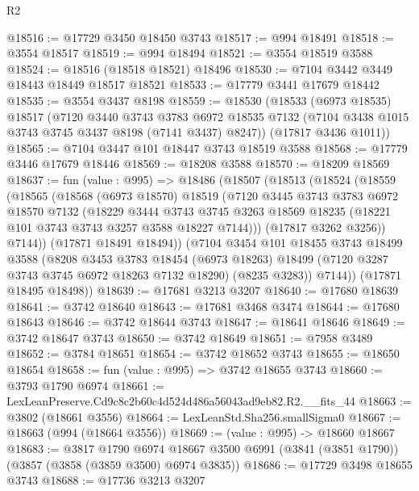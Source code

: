 \begin{lexlean}{R2}
\begin{coremodule}
@18516 := @17729 @3450 @18450 @3743
@18517 := @994 @18491
@18518 := @3554 @18517
@18519 := @994 @18494
@18521 := @3554 @18519 @3588
@18524 := @18516 (@18518 @18521) @18496
@18530 := @7104 @3442 @3449 @18443 @18449 @18517 @18521
@18533 := @17779 @3441 @17679 @18442
@18535 := @3554 @3437 @8198
@18559 := @18530
    (@18533
      (@6973 @18535)
      @18517
      (@7120
        @3440
        @3743
        @3783
        @6972
        @18535
        @7132
        (@7104 @3438 @1015 @3743 @3745 @3437 @8198 (@7141 @3437) @8247))
      (@17817 @3436 @1011))
@18565 := @7104 @3447 @101 @18447 @3743 @18519 @3588
@18568 := @17779 @3446 @17679 @18446
@18569 := @18208 @3588
@18570 := @18209 @18569
@18637 := fun (value : @995) =>
  @18486
    (@18507
      (@18513
        (@18524
          (@18559
            (@18565
              (@18568
                (@6973 @18570)
                @18519
                (@7120
                  @3445
                  @3743
                  @3783
                  @6972
                  @18570
                  @7132
                  (@18229
                    @3444
                    @3743
                    @3745
                    @3263
                    @18569
                    @18235
                    (@18221 @101 @3743 @3743 @3257 @3588 @18227 @7144)))
                (@17817 @3262 @3256))
              @7144))
          (@17871 @18491 @18494))
        (@7104
          @3454
          @101
          @18455
          @3743
          @18499
          @3588
          (@8208
            @3453
            @3783
            @18454
            (@6973 @18263)
            @18499
            (@7120 @3287 @3743 @3745 @6972 @18263 @7132 @18290)
            (@8235 @3283))
          @7144))
      (@17871 @18495 @18498))
@18639 := @17681 @3213 @3207
@18640 := @17680 @18639
@18641 := @3742 @18640
@18643 := @17681 @3468 @3474
@18644 := @17680 @18643
@18646 := @3742 @18644 @3743
@18647 := @18641 @18646
@18649 := @3742 @18647 @3743
@18650 := @3742 @18649
@18651 := @7958 @3489
@18652 := @3784 @18651
@18654 := @3742 @18652 @3743
@18655 := @18650 @18654
@18658 := fun (value : @995) => @3742 @18655 @3743
@18660 := @3793 @1790 @6974
@18661 := LexLeanPreserve.Cd9c8c2b60c4d524d486a56043ad9eb82.R2.__fits_44
@18663 := @3802 (@18661 @3556)
@18664 := LexLeanStd.Sha256.smallSigma0
@18667 := @18663 (@994 (@18664 @3556))
@18669 := (value : @995) -> @18660 @18667
@18683 := @3817
    @1790
    @6974
    @18667
    @3500
    @6991
    (@3841 (@3851 @1790))
    (@3857 (@3858 (@3859 @3500) @6974 @3835))
@18686 := @17729 @3498 @18655 @3743
@18688 := @17736 @3213 @3207

\end{coremodule}
\end{lexlean}
